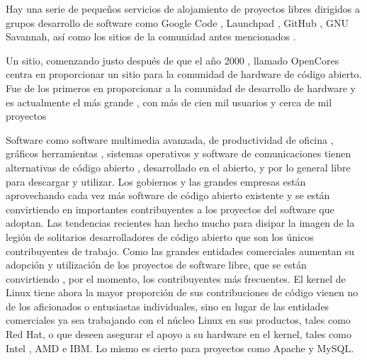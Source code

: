 \documentclass[a4paper,11pt]{article}
\begin{document}
Hay una serie de pequeños servicios de alojamiento de proyectos libres dirigidos a grupos
desarrollo de software como Google Code , Launchpad , GitHub , GNU Savannah,
así como los sitios de la comunidad antes mencionados .

Un sitio, comenzando justo después de que el año 2000 , llamado OpenCores centra en proporcionar
un sitio para la comunidad de hardware de código abierto. Fue de los primeros en
proporcionar a la comunidad de desarrollo de hardware y es actualmente el más grande , con
más de cien mil usuarios y cerca de mil proyectos

Software como software multimedia avanzada, de productividad de oficina , gráficos herramientas , sistemas operativos y software de comunicaciones tienen alternativas de código abierto , desarrollado en el abierto, y por lo general libre para descargar y utilizar. Los gobiernos y las grandes empresas están aprovechando cada vez más software de código abierto existente y se están convirtiendo en importantes contribuyentes a los proyectos del software que adoptan. Las tendencias recientes han hecho mucho para disipar la imagen de la legión de solitarios desarrolladores de código abierto que son los únicos contribuyentes de trabajo. Como las grandes entidades comerciales aumentan su adopción y utilización de los proyectos de software libre, que se están convirtiendo , por el momento, los contribuyentes más frecuentes. El kernel de Linux tiene ahora la mayor proporción de sus contribuciones de código vienen no de los aficionados o entusiastas individuales, sino en lugar de las entidades comerciales ya sea trabajando con el núcleo Linux en sus productos, tales como Red Hat, o que deseen asegurar el apoyo a su hardware en el kernel, tales como Intel , AMD e IBM. Lo mismo es cierto para proyectos como Apache y MySQL.
\end{document}
